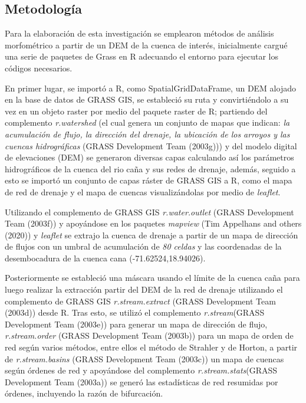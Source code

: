\documentclass[11pt,]{article}
\begin{document}
\subsection{Metodología}\label{metodologuxeda-1}

Para la elaboración de esta investigación se emplearon métodos de
análisis morfométrico a partir de un DEM de la cuenca de interés,
inicialmente cargué una serie de paquetes de Grass en R adecuando el
entorno para ejecutar los códigos necesarios.

En primer lugar, se importó a R, como SpatialGridDataFrame, un DEM
alojado en la base de datos de GRASS GIS, se estableció su ruta y
convirtiéndolo a su vez en un objeto raster por medio del paquete raster
de R; partiendo del complemento \emph{r.watershed} (el cual genera un
conjunto de mapas que indican: \emph{la acumulación de flujo, la
dirección del drenaje, la ubicación de los arroyos y las cuencas
hidrográficas} (GRASS Development Team (2003g))) y del modelo digital de
elevaciones (DEM) se generaron diversas capas calculando así los
parámetros hidrográficos de la cuenca del rio caña y sus redes de
drenaje, además, seguido a esto se importó un conjunto de capas ráster
de GRASS GIS a R, como el mapa de red de drenaje y el mapa de cuencas
visualizándolas por medio de \emph{leaflet}.

Utilizando el complemento de GRASS GIS \emph{r.water.outlet} (GRASS
Development Team (2003f)) y apoyándose en los paquetes \emph{mapview}
(Tim Appelhans and others (2020)) y \emph{leaflet} se extrajo la cuenca
de drenaje a partir de un mapa de dirección de flujos con un umbral de
acumulación de \emph{80 celdas} y las coordenadas de la desembocadura de
la cuenca cana (-71.62524,18.94026).

Posteriormente se estableció una máscara usando el límite de la cuenca
caña para luego realizar la extracción partir del DEM de la red de
drenaje utilizando el complemento de GRASS GIS \emph{r.stream.extract}
(GRASS Development Team (2003d)) desde R. Tras esto, se utilizó el
complemento \emph{r.stream}(GRASS Development Team (2003e)) para generar
un mapa de dirección de flujo, \emph{r.stream.order} (GRASS Development
Team (2003b)) para un mapa de orden de red según varios métodos, entre
ellos el método de Strahler y de Horton, a partir de
\emph{r.stream.basins} (GRASS Development Team (2003c)) un mapa de
cuencas según órdenes de red y apoyándose del complemento
\emph{r.stream.stats}(GRASS Development Team (2003a)) se generó las
estadísticas de red resumidas por órdenes, incluyendo la razón de
bifurcación.
\end{document}
